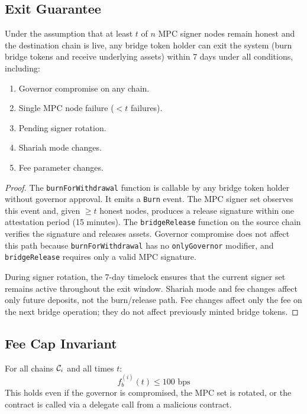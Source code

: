 \subsection{Exit Guarantee}

\begin{theorem}
\label{thm:exit}
Under the assumption that at least $t$ of $n$ MPC signer nodes remain honest and the destination chain is live, any bridge token holder can exit the system (burn bridge tokens and receive underlying assets) within 7 days under all conditions, including:
\begin{enumerate}[nosep]
  \item Governor compromise on any chain.
  \item Single MPC node failure ($< t$ failures).
  \item Pending signer rotation.
  \item Shariah mode changes.
  \item Fee parameter changes.
\end{enumerate}
\end{theorem}

\begin{proof}
The \texttt{burnForWithdrawal} function is callable by any bridge token holder without governor approval. It emits a \texttt{Burn} event. The MPC signer set observes this event and, given $\geq t$ honest nodes, produces a release signature within one attestation period (15 minutes). The \texttt{bridgeRelease} function on the source chain verifies the signature and releases assets. Governor compromise does not affect this path because \texttt{burnForWithdrawal} has no \texttt{onlyGovernor} modifier, and \texttt{bridgeRelease} requires only a valid MPC signature.

During signer rotation, the 7-day timelock ensures that the current signer set remains active throughout the exit window. Shariah mode and fee changes affect only future deposits, not the burn/release path. Fee changes affect only the fee on the next bridge operation; they do not affect previously minted bridge tokens.
\end{proof}

\subsection{Fee Cap Invariant}

\begin{invariant}
\label{inv:feecap}
For all chains $\mathcal{C}_i$ and all times $t$:
\begin{equation}
  f_b^{(i)}(t) \leq 100 \text{ bps}
\end{equation}
This holds even if the governor is compromised, the MPC set is rotated, or the contract is called via a delegate call from a malicious contract.
\end{invariant}

